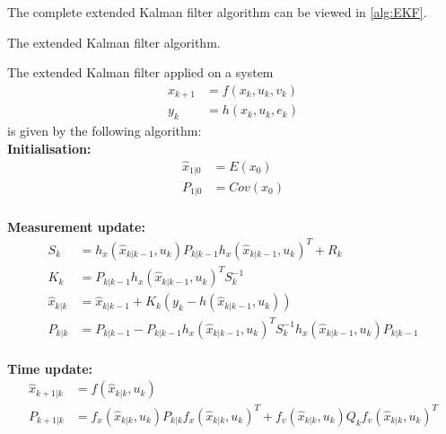 The complete extended Kalman filter algorithm can be viewed in \ref{alg:EKF}.
\begin{algorithm}
\label{alg:EKF}
\caption{The extended Kalman filter algorithm.}
  The extended Kalman filter applied on a system
    \begin{align*}
    x_{k+1} &= f(x_{k},u_{k},v_{k})\\
    y_{k} &= h(x_{k},u_{k},e_{k})
    \end{align*} is given by the following algorithm:\\
    \textbf{Initialisation:}
    \begin{align*}
    \hat{x}_{1|0} &= E(x_{0})\\
    P_{1|0} &= Cov(x_{0})\\
    \end{align*}
     
    \textbf{Measurement update:}
    \begin{align*}
    S_{k} &= h_{x}(\hat{x}_{k|k-1},u_ {k}) P_{k|k-1} h_{x}(\hat{x}_{k|k-1},u_ {k})^{T} + R_{k}\\
    K_{k} &= P_{k|k-1} h_{x}(\hat{x}_{k|k-1},u_ {k})^{T} S_{k}^{-1}\\
    \hat{x}_{k|k} &= \hat{x}_{k|k-1} + K_{k} (y_{k} - h(\hat{x}_{k|k-1},u_ {k}))\\
    P_{k|k} &= P_{k|k-1} - P_{k|k-1} h_{x}(\hat{x}_{k|k-1},u_ {k})^{T} S_{k}^{-1} h_{x}(\hat{x}_{k|k-1},u_ {k}) P_{k|k-1}\\
    \end{align*}
    
   \textbf{Time update:}
    \begin{align*}
    \hat{x}_{k+1|k} &= f(\hat{x}_{k|k},u_ {k})\\
    P_{k+1|k} &= f_{x}(\hat{x}_{k|k},u_ {k})P_{k|k} f_{x}(\hat{x}_{k|k},u_ {k})^{T} + f_{v}(\hat{x}_{k|k},u_ {k}) Q_{k} f_{v}(\hat{x}_{k|k},u_ {k})^{T}
    \end{align*}    
\end{algorithm}


